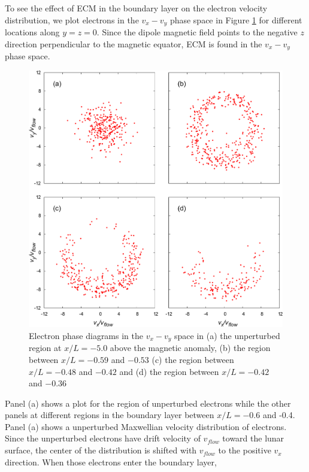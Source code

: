 \documentclass[draft,jgrga]{agutex2015}
\begin{document}
\begin{article}

To see the effect of ECM in the boundary layer on the electron velocity distribution, 
we plot electrons in the $v_x-v_y$ phase space 
in Figure \ref{fig:10} for different locations along $y=z=0$.
Since the dipole magnetic field points to the negative $z$ direction perpendicular
to the magnetic equator, 
ECM is found in the $v_x-v_y$ phase space.
\begin{figure}
\centering
\noindent\includegraphics[width=15cm]{./figures/Fig_10_bb-crop.pdf}
\caption{Electron phase diagrams in the $v_{x}-v_{y}$ space in 
(a) the unperturbed region at $x/L = -5.0$ above the magnetic anomaly, 
(b) the region between $x/L =-0.59$ and $-0.53$  
(c) the region between $x/L =-0.48$ and $-0.42$ and
(d) the region between $x/L =-0.42$ and $-0.36$ }
\label{fig:10}
\end{figure}
Panel (a) shows a plot for the region of 
unperturbed electrons while the other panels
at different regions in the boundary layer between $x/L = -0.6$ and -0.4.
Panel (a) shows a unperturbed Maxwellian velocity distribution of electrons.
Since the unperturbed electrons have 
drift velocity of $v_{flow}$ toward the lunar surface,
the center of the distribution is shifted with $v_{flow}$ 
to the positive $v_x$ direction.
%
When those electrons enter the boundary layer, 

\end{article}
\end{document}
